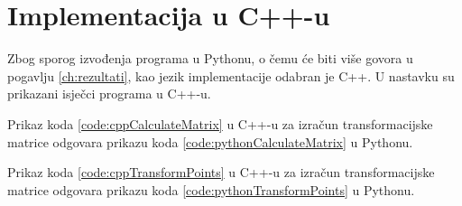 \section{Implementacija u C++-u}
\label{sec:implC++}
\lstset{
	language=C++, 
	tabsize=2,
	numbers=left,
	breaklines=true,
	basicstyle=\ttfamily,
	columns=fixed
}

Zbog sporog izvođenja programa u Pythonu, o čemu će biti više govora u pogavlju \ref{ch:rezultati}, kao jezik implementacije odabran je C++. U nastavku su prikazani isječci programa u C++-u.



Prikaz koda \ref{code:cppCalculateMatrix} u C++-u za izračun transformacijske matrice odgovara prikazu koda \ref{code:pythonCalculateMatrix} u Pythonu.



Prikaz koda \ref{code:cppTransformPoints} u C++-u za izračun transformacijske matrice odgovara prikazu koda \ref{code:pythonTransformPoints} u Pythonu.
